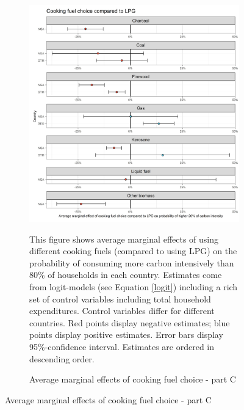  \begin{figure}[ht!]\ContinuedFloat
   \centering
   \begin{subfigure}[b]{\textwidth}
   \centering
   \caption{Average marginal effects of cooking fuel choice - part C} \label{fig:Logit_ME_CF_3}
   \includegraphics{1_Figures/Analysis_Logit_Models_Marginal_Effects/Average_Marginal_Effects_affected_upper_80_CF_LPG_2017.jpg}
   \begin{subcaption2}
     This figure shows average marginal effects of using different cooking fuels (compared to using LPG) on the probability of consuming more carbon intensively than 80\% of households in each country. Estimates come from logit-models (see Equation \ref{logit}) including a rich set of control variables including total household expenditures. Control variables differ for different countries. Red points display negative estimates; blue points display positive estimates. Error bars display 95\%-confidence interval. Estimates are ordered in descending order.
   \end{subcaption2}
   \end{subfigure}
 \end{figure}
 \clearpage

